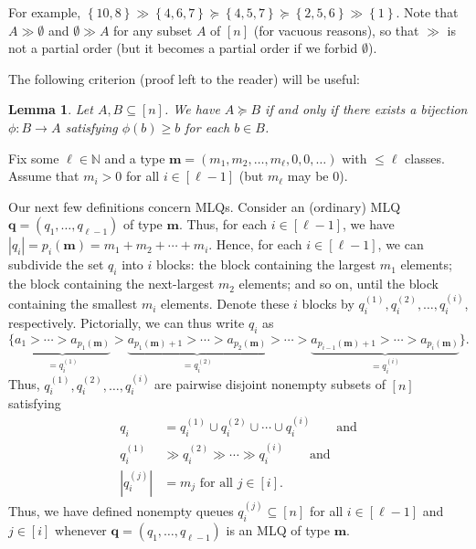 \documentclass[reqno]{amsart}
\newcommand{\0}{\phantom{c}}
\newcommand{\mm}{\mathbf{m}}
\newcommand{\qq}{\mathbf{q}}
\newcommand{\NN}{\mathbb{N}}
\newcommand{\set}[1]{\left\{ #1 \right\}}
\newcommand{\abs}[1]{\left| #1 \right|}
\newcommand{\tup}[1]{\left( #1 \right)}
\newcommand{\ive}[1]{\left[ #1 \right]}
\theoremstyle{plain}
\newtheorem{lemma}[thm]{Lemma}
\theoremstyle{definition}
\numberwithin{equation}{section}
\begin{document}
For example, $\set{10,8} \gg \set{4,6,7} \succeq \set{4,5,7} \succeq \set{2,5,6}  \gg \set{1}$.
Note that $A \gg \emptyset$ and $\emptyset \gg A$ for any subset $A$ of $\ive{n}$ (for vacuous reasons), so that $\gg$ is not a partial order (but it becomes a partial order if we forbid $\emptyset$).

The following criterion (proof left to the reader) will be useful:

\begin{lemma}
\label{lem:determinant_form.gale1}
Let $A, B \subseteq \ive{n}$.
We have $A \succeq B$ if and only if there exists a bijection $\phi \colon B \to A$ satisfying $\phi(b) \geq b$ for each $b \in B$.
\end{lemma}

Fix some $\ell \in \NN$ and a type $\mm = \tup{m_1,m_2, \dotsc, m_{\ell}, 0, 0, \ldots}$ with $\leq \ell$ classes.
Assume that $m_i > 0$ for all $i \in \ive{\ell-1}$ (but $m_{\ell}$ may be $0$).

Our next few definitions concern MLQs.
Consider an (ordinary) MLQ $\qq = \tup{q_1,\ldots,q_{\ell-1}}$ of type $\mm$.
Thus, for each $i \in \ive{\ell-1}$, we have $\abs{q_i} = p_i(\mm) = m_1 + m_2 + \cdots + m_i$.
Hence, for each $i \in \ive{\ell-1}$, we can subdivide the set $q_i$ into $i$ blocks: the block containing the largest $m_1$ elements; the block containing the next-largest $m_2$ elements; and so on, until the block containing the smallest $m_i$ elements.
Denote these $i$ blocks by $q_i^{(1)}, q_i^{(2)}, \dotsc, q_i^{(i)}$, respectively.
Pictorially, we can thus write $q_i$ as
\[
\bigl\{ \underbrace{a_1 > \cdots > a_{p_1(\mm)}}_{=q_i^{(1)}} > \underbrace{a_{p_1(\mm)+1} > \cdots > a_{p_2(\mm)}}_{=q_i^{(2)}} > \cdots > \underbrace{a_{p_{i-1}(\mm)+1} > \cdots > a_{p_i(\mm)}}_{=q_i^{(i)}} \bigr\}.
\]
Thus, $q_i^{(1)}, q_i^{(2)}, \dotsc, q_i^{(i)}$ are pairwise disjoint nonempty subsets of $\ive{n}$ satisfying
\begin{subequations}
\label{eq.determinant_form.qij}
\begin{align}
\label{eq.determinant_form.qij.1}
  q_i  & = q_i^{(1)} \cup q_i^{(2)} \cup \cdots \cup q_i^{(i)}
\qquad \text{and}
\\ \label{eq.determinant_form.qij.2}
  q_i^{(1)} & \gg q_i^{(2)} \gg \cdots \gg q_i^{(i)}
\qquad \text{and}
\\ \label{eq.determinant_form.qij.3}
  \abs{q_i^{(j)}} & = m_j \text{ for all } j \in \ive{i}.
\end{align}
\end{subequations}
Thus, we have defined nonempty queues $q_i^{(j)} \subseteq \ive{n}$ for all $i \in \ive{\ell-1}$ and $j \in \ive{i}$ whenever $\qq = \tup{q_1, \dotsc, q_{\ell-1}}$ is an MLQ of type $\mm$.
\end{document}
